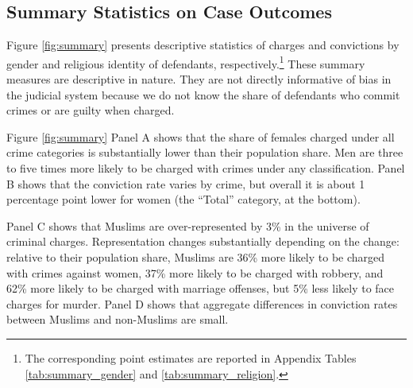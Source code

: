 \documentclass[12pt,english]{article}
\begin{document}
\subsection{Summary Statistics on Case Outcomes}

Figure \ref{fig:summary}  presents descriptive statistics of charges and convictions by gender and religious identity of defendants, respectively.\footnote{The corresponding point estimates are reported in Appendix Tables \ref{tab:summary_gender} and \ref{tab:summary_religion}.} These summary measures are descriptive in nature. They are not directly informative of bias in the judicial system because we do not know the share of defendants who commit crimes or are guilty when charged.

Figure \ref{fig:summary} Panel A shows that the share of females charged under all crime categories is substantially lower than their population share. Men are three to five times more likely to be charged with crimes under any classification. Panel B shows that the conviction rate varies by crime, but overall it is about 1 percentage point lower for women (the ``Total'' category, at the bottom). 

Panel C shows that Muslims are over-represented by 3\% in the universe of criminal charges. Representation changes substantially depending on the change: relative to their population share, Muslims are 36\% more likely to be charged with crimes against women, 37\% more likely to be charged with robbery, and 62\% more likely to be charged with marriage offenses, but 5\% less likely to face charges for murder. Panel D shows that aggregate differences in conviction rates between Muslims and non-Muslims are small.

\end{document}
